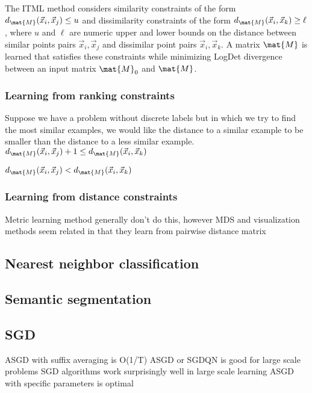 The \acf{ITML} method \cite{davis2007information} considers similarity constraints of the form $d_{\mat{M}}(\vec{x}_{i}, \vec{x}_{j}) \leq u$ and dissimilarity constraints of the form $d_{\mat{M}}(\vec{x}_{i}, \vec{x}_{k}) \geq \ell$, where $u$ and $\ell$ are numeric upper and lower bounds on the distance between similar points pairs $\vec{x}_{i}, \vec{x}_{j}$ and dissimilar point pairs $\vec{x}_{i}, \vec{x}_{k}$. A matrix $\mat{M}$ is learned that satisfies these constraints while minimizing LogDet divergence between an input matrix $\mat{M}_0$ and $\mat{M}$.


\subsubsection{Learning from ranking constraints}

Suppose we have a problem without discrete labels but in which we try to find the most similar examples, we would like the distance to a similar example to be smaller than the distance to a less similar example.
$d_{\mat{M}}(\vec{x}_{i}, \vec{x}_{j}) + 1 \leq d_{\mat{M}}(\vec{x}_{i}, \vec{x}_{k})$

$d_{\mat{M}}(\vec{x}_{i}, \vec{x}_{j}) < d_{\mat{M}}(\vec{x}_{i}, \vec{x}_{k})$

\subsubsection{Learning from distance constraints}

Metric learning method generally don't do this, however MDS and visualization methods seem related in that they learn from pairwise distance matrix

\subsection{Nearest neighbor classification}

\subsection{Semantic segmentation}



\subsection{SGD}
 \cite{rakhlin2012making} ASGD with suffix averaging is O(1/T) \cite{bottou2010large} ASGD or SGDQN is good for large scale problems \cite{bottou2008tradeoffs} SGD algorithms work surprisingly well in large scale learning \cite{xu2011towards} ASGD with specific parameters is optimal

